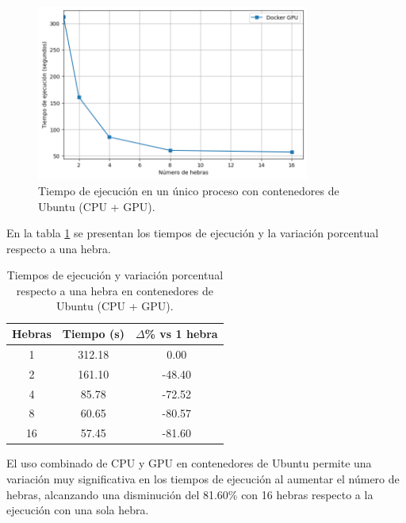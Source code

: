 \begin{figure}[ht]
    \centering
    \includegraphics[width=0.8\textwidth]{imagenes/cap5/single-node_ubuntu_docker_gpu_time.png}
    \caption{Tiempo de ejecución en un único proceso con contenedores de Ubuntu (CPU + GPU).}
    \label{fig:single-node_ubuntu_docker_gpu_time}
\end{figure}

En la tabla \ref{tab:single-node_ubuntu_docker_gpu} se presentan los tiempos de ejecución y la variación porcentual respecto a una hebra.

\begin{table}[ht]
    \centering
    \begin{tabular}{|c|c|c|}
        \hline
        \textbf{Hebras} & \textbf{Tiempo (s)} & \textbf{$\Delta$\% vs 1 hebra} \\
        \hline
        1               & 312.18              & 0.00                           \\
        2               & 161.10              & -48.40                         \\
        4               & 85.78               & -72.52                         \\
        8               & 60.65               & -80.57                         \\
        16              & 57.45               & -81.60                         \\
        \hline
    \end{tabular}
    \caption{Tiempos de ejecución y variación porcentual respecto a una hebra en contenedores de Ubuntu (CPU + GPU).}
    \label{tab:single-node_ubuntu_docker_gpu}
\end{table}

El uso combinado de CPU y GPU en contenedores de Ubuntu permite una variación muy significativa en los tiempos de ejecución al aumentar el número de hebras, alcanzando una disminución del 81.60\% con 16 hebras respecto a la ejecución con una sola hebra.

